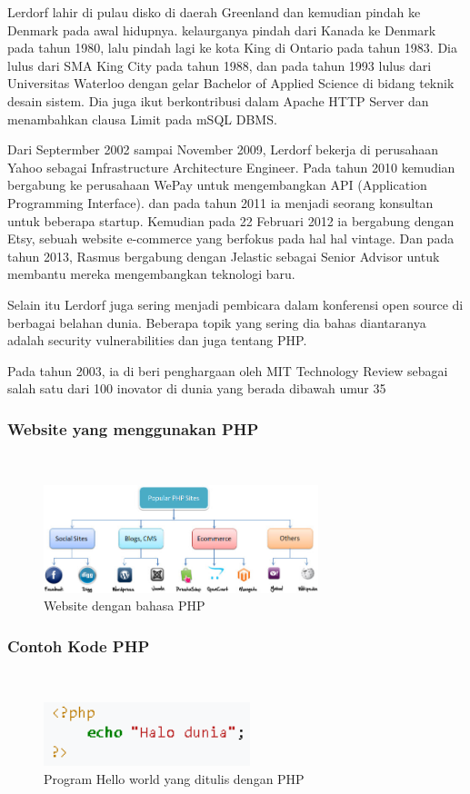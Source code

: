 Lerdorf lahir di pulau disko di daerah Greenland dan kemudian pindah ke Denmark pada awal hidupnya. kelaurganya pindah dari Kanada ke Denmark pada tahun 1980, lalu pindah lagi ke kota King di Ontario pada tahun 1983. Dia lulus dari SMA King City pada tahun 1988, dan pada tahun 1993 lulus dari Universitas Waterloo dengan gelar  Bachelor of Applied Science di bidang teknik desain sistem. Dia juga ikut berkontribusi dalam Apache HTTP Server dan menambahkan clausa Limit pada mSQL DBMS. 

Dari Septermber 2002 sampai November 2009, Lerdorf bekerja di perusahaan Yahoo sebagai Infrastructure Architecture Engineer. Pada tahun 2010 kemudian bergabung ke perusahaan WePay untuk mengembangkan API (Application Programming Interface). dan pada tahun 2011 ia menjadi seorang konsultan untuk beberapa startup. Kemudian pada 22 Februari 2012 ia bergabung dengan Etsy, sebuah website e-commerce yang berfokus pada hal hal vintage. Dan pada tahun 2013, Rasmus bergabung dengan Jelastic sebagai Senior Advisor untuk membantu mereka mengembangkan teknologi baru.

Selain itu Lerdorf juga sering menjadi pembicara dalam konferensi open source di berbagai belahan dunia. Beberapa topik yang sering dia bahas diantaranya adalah security vulnerabilities dan juga tentang PHP.

Pada tahun 2003, ia di beri penghargaan oleh MIT Technology Review sebagai salah satu dari 100 inovator di dunia yang berada dibawah umur 35

\subsubsection{Website yang menggunakan PHP} 
\hfill\\
	\begin{figure}[H]
		\includegraphics[width=8cm]{figures/web/popularphpsites.jpg}
		\centering
		\caption{Website dengan bahasa PHP}
	\end{figure}

\subsubsection{Contoh Kode PHP}
\hfill\\
	\begin{figure}[H]
		\includegraphics[width=6cm]{figures/web/contohkodingphp.png}
		\centering
		\caption{Program Hello world yang ditulis dengan PHP}
	\end{figure}
